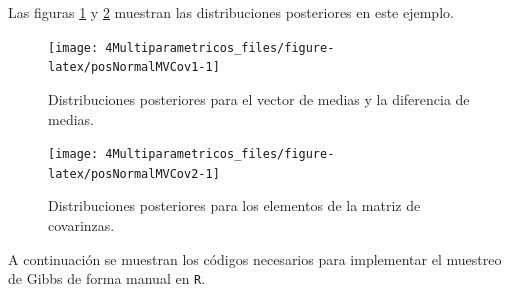 \documentclass[
  10pt,
  spanish,
]{book}
\theoremstyle{definition}
\theoremstyle{definition}
\theoremstyle{definition}
\theoremstyle{definition}
\theoremstyle{remark}
\begin{document}
Las figuras \ref{fig:posNormalMVCov1} y \ref{fig:posNormalMVCov2} muestran las distribuciones posteriores en este ejemplo.

\begin{figure}

{\centering \texttt{[image: 4Multiparametricos\_files/figure-latex/posNormalMVCov1-1]} 

}

\caption{Distribuciones posteriores para el vector de medias y la diferencia de medias.}\label{fig:posNormalMVCov1}
\end{figure}
\begin{figure}

{\centering \texttt{[image: 4Multiparametricos\_files/figure-latex/posNormalMVCov2-1]} 

}

\caption{Distribuciones posteriores para los elementos de la matriz de covarinzas.}\label{fig:posNormalMVCov2}
\end{figure}

A continuación se muestran los códigos necesarios para implementar el muestreo de Gibbs de forma manual en \texttt{R}.
\end{document}
